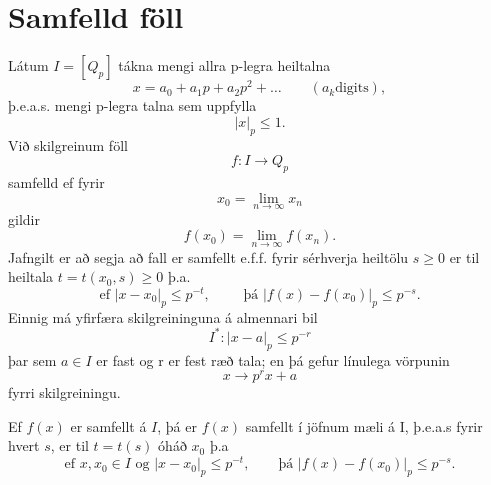 \section*{Samfelld föll}
Látum $I=[Q_p]$ tákna mengi allra p-legra heiltalna
\begin{equation*}
x = a_0 + a_1p+a_2p^2 + \ldots \qquad (a_k \mbox{digits}), 
\end{equation*} 
þ.e.a.s. mengi p-legra talna sem uppfylla
\begin{equation*}
 |x|_p \leq 1 .
\end{equation*}
Við skilgreinum föll
\begin{equation*}
f:I \rightarrow Q_p
\end{equation*}
samfelld ef fyrir 
\begin{equation*}
x_0 = \lim_{n \rightarrow \infty} x_n
\end{equation*}
gildir
\begin{equation*}
f(x_0) = \lim_{n \rightarrow \infty} f(x_n).
\end{equation*}
Jafngilt er að segja að fall er samfellt e.f.f. fyrir sérhverja heiltölu $s\geq 0$ er til heiltala $t = t(x_0,s)\geq 0$ þ.a.
\begin{equation*}
\mbox{ef } |x-x_0|_p \leq p^{-t},\qquad \mbox{  þá } |f(x)-f(x_0)|_p \leq p^{-s}.
\end{equation*}
Einnig má yfirfæra skilgreininguna á almennari bil
\begin{equation*}
I^* : |x-a|_p \leq p^{-r}
\end{equation*} 
þar sem $a \in I$ er fast og r er fest ræð tala; en þá gefur línulega vörpunin 
\begin{equation*}
x \rightarrow p^rx+a
\end{equation*}
fyrri skilgreiningu.
\begin{setn}
Ef $f(x)$ er samfellt á $I$, þá er $f(x)$ samfellt í jöfnum mæli á I, þ.e.a.s fyrir hvert $s$, er til $t=t(s)$ óháð $x_0$ þ.a 
\begin{equation}
\mbox{ef   } x,x_0\in I \mbox{ og  } |x-x_0|_p \leq p^{-t}, \qquad \mbox{þá  } |f(x)-f(x_0)|_p \leq p^{-s}.
\end{equation}
\end{setn} 

